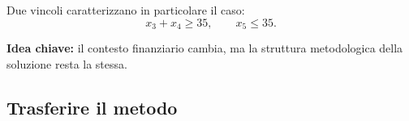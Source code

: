 \documentclass[handout]{beamer}%
\providecommand{\1}{\mathbf{1}}
\begin{document}
\begin{frame}

Due vincoli caratterizzano in particolare il caso:
\vspace{-0.1cm}
\[
x_3+x_4\ge35,
\qquad
x_5\le35.
\]

\vspace{0.2cm}

\textbf{Idea chiave:} il contesto finanziario cambia, ma la struttura
metodologica della soluzione resta la stessa.

\transboxout%
\end{frame}%

\subsection{Trasferire il metodo}

\end{document}
